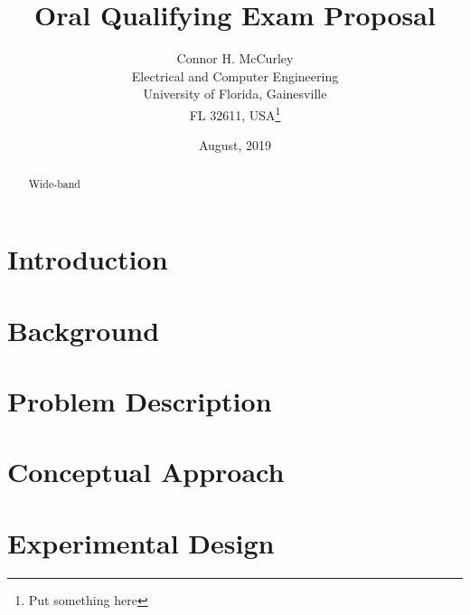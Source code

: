 \documentclass{article}[10 pt]
\begin{document}
\title{Oral Qualifying Exam Proposal}
\date{August, 2019}
\author{Connor H. McCurley\\ Electrical and Computer Engineering\\ University of Florida, Gainesville\\FL 32611, USA\thanks{Put something here}}

\maketitle

\tableofcontents


\begin{abstract}
Wide-band
\end{abstract}

\section{Introduction}

\section{Background}

\section{Problem Description}

\section{Conceptual Approach}

\section{Experimental Design}
\end{document}
